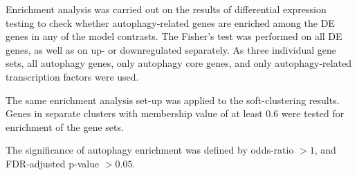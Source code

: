         
        Enrichment analysis was carried out on the results of differential expression testing to check whether autophagy-related genes are enriched among the DE genes in any of the model contrasts. The Fisher's test was performed on all DE genes, as well as on up- or downregulated separately. As three individual gene sets, all autophagy genes, only autophagy core genes, and only autophagy-related transcription factors were used. 
        
        The same enrichment analysis set-up was applied to the soft-clustering results. Genes in separate clusters with membership value of at least $0.6$ were tested for enrichment of the gene sets.

        The significance of autophagy enrichment was defined by odds-ratio 
        $>1$, and FDR-adjusted p-value $>0.05$. 





    
